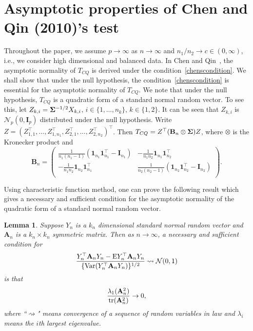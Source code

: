 \documentclass[times,sort&compress,3p]{elsarticle}
\newcommand{\mytr}{ {\rm tr} }
\newcommand{\myE}{ {\rm E} }
\newcommand{\myVar}{ {\rm Var} }
\newcommand{\BA}{\mathbf{A}}    \newcommand{\BB}{\mathbf{B}}    \newcommand{\BC}{\mathbf{C}}    \newcommand{\BD}{\mathbf{D}}    \newcommand{\BE}{\mathbf{E}}    \newcommand{\BF}{\mathbf{F}}    \newcommand{\BG}{\mathbf{G}}    \newcommand{\BH}{\mathbf{H}}    \newcommand{\BI}{\mathbf{I}}    \newcommand{\BJ}{\mathbf{J}}    \newcommand{\BK}{\mathbf{K}}    \newcommand{\BL}{\mathbf{L}}
\theoremstyle{plain}
\newtheorem{lemma}{\quad\quad Lemma}
\theoremstyle{definition}
\theoremstyle{remark}
\begin{document}
\section{Asymptotic properties of Chen and Qin (2010)'s test}\label{sec:chen}
Throughout the paper, we  assume $p\to \infty$ as $n\to \infty$ and ${n_1}/{n_2}\to c \in (0,\infty)$, i.e., we consider high dimensional and balanced data.
    In Chen and Qin~\cite{Chen2010A}, the asymptotic normality of $T_{CQ}$ is derived under the condition~\eqref{chenscondition}.
    We shall show that under the null hypothesis, the condition~\eqref{chenscondition} is essential for the asymptotic normality of $T_{CQ}$.
We note that under the null hypothesis, $T_{CQ}$ is a quadratic form of a standard normal random vector.
To see this,
let $Z_{k,i}=\boldsymbol{\Sigma}^{-1/2}X_{k,i}$, $i\in \{1,\ldots,n_k \}$, $k\in \{1,2\}$.
It can be seen that $Z_{k,i}$ is $ \mathcal{N}_p(0,\BI_{p})$ distributed under the null hypothesis.
Write $Z=(Z_{1,1}^\top ,\ldots,Z_{1,n_1}^\top ,Z_{2,1}^\top ,\ldots,Z_{2,n_2}^\top )^\top $.
    Then $T_{CQ}=Z^\top  ( \BB_n\otimes \bSigma ) Z$, where $\otimes$ is the Kronecker product and
    \begin{equation*}
        \BB_n=\begin{pmatrix}
            \displaystyle \frac{1}{n_1(n_1-1)}(\mathbf{1}_{n_1} \mathbf{1}_{n_1}^\top -\BI_{n_1})& \displaystyle 
            -\frac{1}{n_1 n_2}\mathbf{1}_{n_1} \mathbf{1}_{n_2}^\top \\
\displaystyle 
            -\frac{1}{n_1 n_2}\mathbf{1}_{n_2} \mathbf{1}_{n_1}^\top &
\displaystyle 
            \frac{1}{n_2(n_2-1)}( \mathbf{1}_{n_2} \mathbf{1}_{n_2}^\top -\BI_{n_2})\\
        \end{pmatrix}.
    \end{equation*}
    
Using characteristic function method, one can prove the following result which gives a necessary and sufficient condition for the asymptotic normality of the quadratic form of a standard normal random vector.
\begin{lemma}\label{quadraticFormCLT}
    Suppose $Y_{n}$ is a $k_n$ dimensional standard normal random vector and $\BA_n$ is a $k_n\times k_n$ symmetric matrix. Then as $n\to \infty$, a necessary and sufficient condition for
    \begin{equation}\label{quadratic}
        \frac{Y_n^\top  \BA_n Y_n- \myE Y_n^\top  \BA_n Y_n}{\{\myVar (Y_n^\top  \BA_n Y_n)\}^{1/2}}\rightsquigarrow \mathcal{N}(0,1)
    \end{equation}
    is that
    \begin{equation}\label{quadraticEigen}
        \frac{\lambda_{1}(\BA_n^2)}{\mytr(\BA_n^2)}\to 0,
    \end{equation}
    where ``$\rightsquigarrow $" means convergence of a sequence of random variables in law and $\lambda_{i}$ means the $i$th largest eigenvalue.
\end{lemma}
\end{document}
